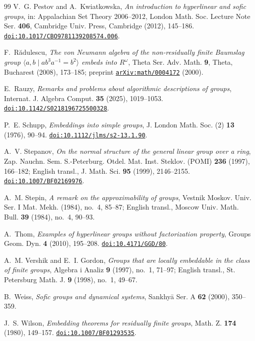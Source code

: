 \documentclass[11pt]{amsart}
\newcommand{\doi}[1]{\href{https://doi.org/#1}{\nolinkurl{doi:#1}}}
\newcommand{\arxiv}[1]{\href{https://arxiv.org/abs/#1}{\nolinkurl{arXiv:#1}}}
\begin{document}
\begin{thebibliography}{99}
V.~G. Pestov and A.~Kwiatkowska,
\emph{An introduction to hyperlinear and sofic groups},
in: Appalachian Set Theory 2006--2012, London Math. Soc. Lecture Note
Ser. \textbf{406}, Cambridge Univ. Press, Cambridge (2012), 145--186.
\doi{10.1017/CBO9781139208574.006}.

F.~R\u{a}dulescu, \emph{The von Neumann algebra of the non-residually
finite Baumslag group $\langle a,b\mid ab^3a^{-1}=b^2\rangle$ embeds into
$R^\omega$}, Theta Ser. Adv. Math. \textbf{9}, Theta, Bucharest (2008),
173--185; preprint \arxiv{math/0004172} (2000).

E.~Rauzy, \emph{Remarks and problems about algorithmic descriptions of
groups}, Internat. J. Algebra Comput. \textbf{35} (2025), 1019--1053.
\doi{10.1142/S0218196725500328}.

P.~E. Schupp, \emph{Embeddings into simple groups},
J. London Math. Soc. (2) \textbf{13} (1976), 90--94.
\doi{10.1112/jlms/s2-13.1.90}.

A.~V. Stepanov, \emph{On the normal structure of the general linear
group over a ring}, Zap. Nauchn. Sem. S.-Peterburg. Otdel. Mat. Inst. Steklov. (POMI) \textbf{236} (1997), 166--182;
English transl., J. Math. Sci. \textbf{95} (1999), 2146--2155.
\doi{10.1007/BF02169976}.

A.~M. Stepin, \emph{A remark on the approximability of groups},
Vestnik Moskov. Univ. Ser. I Mat. Mekh. (1984), no.~4, 85--87;
English transl., Moscow Univ. Math. Bull. \textbf{39} (1984), no.~4, 90--93.

A.~Thom, \emph{Examples of hyperlinear groups without factorization
property}, Groups Geom. Dyn. \textbf{4} (2010), 195--208.
\doi{10.4171/GGD/80}.

A.~M. Vershik and E.~I. Gordon,
\emph{Groups that are locally embeddable in the class of finite groups},
Algebra i Analiz \textbf{9} (1997), no.~1, 71--97; English transl.,
St. Petersburg Math. J. \textbf{9} (1998), no.~1, 49--67.

B.~Weiss, \emph{Sofic groups and dynamical systems}, Sankhy\={a} Ser. A
\textbf{62} (2000), 350--359.

J.~S. Wilson, \emph{Embedding theorems for residually finite groups},
Math. Z. \textbf{174} (1980), 149--157.
\doi{10.1007/BF01293535}.

\end{thebibliography}
\end{document}
